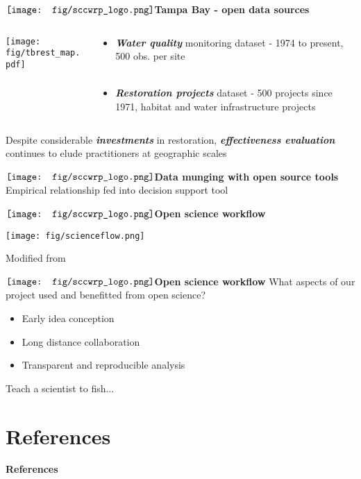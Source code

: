 \documentclass[serif]{beamer}\usepackage[]{graphicx}\usepackage[]{color}
\newcommand{\emtxt}[1]{\textbf{\textit{{\color{mypal4} #1}}}}
\begin{document}
\begin{frame}{{$\vcenter{\hbox{\texttt{[image: fig/sccwrp\_logo.png]}}}$\hspace{0.07in}\textbf{Tampa Bay - open data sources}}}
\begin{columns}
\begin{column}{0.5\textwidth}
\onslide<+->
\begin{center}
\texttt{[image: fig/tbrest\_map.pdf]}
\end{center}
\end{column}
\begin{column}{0.5\textwidth}
\begin{itemize}
\item \emtxt{Water quality} monitoring dataset - 1974 to present, ~ 500 obs. per site \\~\\
\item<+-> \emtxt{Restoration projects} dataset - 500 projects since 1971, habitat and water infrastructure projects
\end{itemize}
\end{column}
\end{columns}
\onslide<+->
\begin{center}
Despite considerable \emtxt{investments} in restoration, \emtxt{effectiveness evaluation} continues to elude practitioners at geographic scales {\footnotesize \cite{Diefenderfer16}}
\end{center}
\end{frame}

\begin{frame}{{$\vcenter{\hbox{\texttt{[image: fig/sccwrp\_logo.png]}}}$\hspace{0.07in}\textbf{Data munging with open source tools}}}
Empirical relationship fed into decision support tool
\end{frame}

\begin{frame}{{$\vcenter{\hbox{\texttt{[image: fig/sccwrp\_logo.png]}}}$\hspace{0.07in}\textbf{Open science workflow}}}
\centerline{\texttt{[image: fig/scienceflow.png]}}
\vfill
\tiny
Modified from \cite{Hampton15}
\end{frame}

\begin{frame}{{$\vcenter{\hbox{\texttt{[image: fig/sccwrp\_logo.png]}}}$\hspace{0.07in}\textbf{Open science workflow}}}
What aspects of our project used and benefitted from open science?
\begin{itemize}
\item Early idea conception
\item Long distance collaboration
\item Transparent and reproducible analysis
\end{itemize}
\centerline{Teach a scientist to fish...}
\end{frame}

\section{References}
\begin{frame}[t,shrink]{\textbf{References}}
\tiny
{}


\end{frame}
\end{document}
